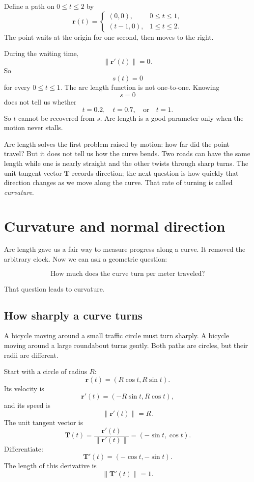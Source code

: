 \begin{example}
Define a path on \(0\le t\le2\) by
\[
    \mathbf r(t)=
    \begin{cases}
    (0,0), & 0\le t\le1,\\
    (t-1,0), & 1\le t\le2.
    \end{cases}
\]
The point waits at the origin for one second, then moves to the right.

During the waiting time,
\[
    \|\mathbf r'(t)\|=0.
\]
So
\[
    s(t)=0
\]
for every \(0\le t\le1\).  The arc length function is not one-to-one.  Knowing
\[
    s=0
\]
does not tell us whether
\[
    t=0.2,\quad t=0.7,\quad \text{or}\quad t=1.
\]
So \(t\) cannot be recovered from \(s\).  Arc length is a good parameter only when the
motion never stalls.
\end{example}

Arc length solves the first problem raised by motion: how far did the point travel?
But it does not tell us how the curve bends.  Two roads can have the same length while
one is nearly straight and the other twists through sharp turns.  The unit tangent vector
\(\mathbf T\) records direction; the next question is how quickly that direction changes
as we move along the curve.  That rate of turning is called \emph{curvature}.

\section{Curvature and normal direction}
\label{sec:5.4}

Arc length gave us a fair way to measure progress along a curve.  It removed the
arbitrary clock.  Now we can ask a geometric question:

\[
    \text{How much does the curve turn per meter traveled?}
\]

That question leads to curvature.

\subsection{How sharply a curve turns}

A bicycle moving around a small traffic circle must turn sharply.  A bicycle moving
around a large roundabout turns gently.  Both paths are circles, but their radii are
different.

Start with a circle of radius \(R\):
\[
    \mathbf r(t)=(R\cos t,R\sin t).
\]
Its velocity is
\[
    \mathbf r'(t)=(-R\sin t,R\cos t),
\]
and its speed is
\[
    \|\mathbf r'(t)\|=R.
\]
The unit tangent vector is
\[
    \mathbf T(t)
    =
    \frac{\mathbf r'(t)}{\|\mathbf r'(t)\|}
    =
    (-\sin t,\cos t).
\]
Differentiate:
\[
    \mathbf T'(t)=(-\cos t,-\sin t).
\]
The length of this derivative is
\[
    \|\mathbf T'(t)\|=1.
\]

